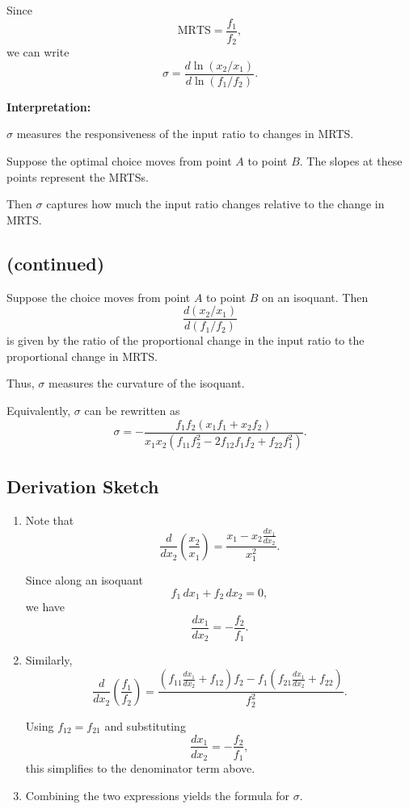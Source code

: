 Since
\[
\text{MRTS}
=
\frac{f_1}{f_2},
\]
we can write
\[
\sigma
=
\frac{d \ln(x_2/x_1)}{d \ln(f_1/f_2)}.
\]

\medskip

\textbf{Interpretation:}

$\sigma$ measures the responsiveness of the input ratio to changes in MRTS.

\medskip

Suppose the optimal choice moves from point $A$ to point $B$.
The slopes at these points represent the MRTSs.

Then $\sigma$ captures how much the input ratio changes relative to
the change in MRTS.



\subsection*{(continued)}

Suppose the choice moves from point $A$ to point $B$ on an isoquant.
Then
\[
\frac{d(x_2/x_1)}{d(f_1/f_2)}
\]
is given by the ratio of the proportional change in the input ratio
to the proportional change in MRTS.

Thus, $\sigma$ measures the curvature of the isoquant.

\medskip

Equivalently, $\sigma$ can be rewritten as
\[
\sigma
=
-\frac{f_1 f_2 (x_1 f_1 + x_2 f_2)}
{x_1 x_2 \left( f_{11} f_2^2 - 2 f_{12} f_1 f_2 + f_{22} f_1^2 \right)}.
\]

\subsection*{Derivation Sketch}

\begin{enumerate}
    \item Note that
    \[
    \frac{d}{dx_2}\left(\frac{x_2}{x_1}\right)
    =
    \frac{x_1 - x_2 \frac{dx_1}{dx_2}}{x_1^2}.
    \]

    Since along an isoquant
    \[
    f_1\,dx_1 + f_2\,dx_2 = 0,
    \]
    we have
    \[
    \frac{dx_1}{dx_2} = -\frac{f_2}{f_1}.
    \]

    \item Similarly,
    \[
    \frac{d}{dx_2}\left(\frac{f_1}{f_2}\right)
    =
    \frac{\left(f_{11}\frac{dx_1}{dx_2} + f_{12}\right)f_2
    -
    f_1\left(f_{21}\frac{dx_1}{dx_2} + f_{22}\right)}
    {f_2^2}.
    \]

    Using $f_{12}=f_{21}$ and substituting
    \[
    \frac{dx_1}{dx_2}=-\frac{f_2}{f_1},
    \]
    this simplifies to the denominator term above.

    \item Combining the two expressions yields the formula for $\sigma$.
\end{enumerate}


